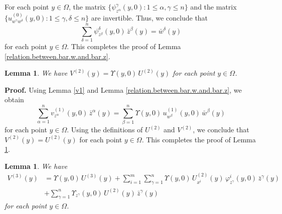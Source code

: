 \documentclass[11pt]{amsart}
\newtheorem{lemma}[theorem]{Lemma}
\theoremstyle{definition}
\begin{document}
For each point $y \in \Omega$, the matrix $\{\psi^\gamma_{z^\alpha}(y,0): 1 \leq \alpha,\gamma \leq n\}$ and the matrix $\{u^{(0)}_{w^\gamma w^\delta}(y,0): 1 \leq \gamma,\delta \leq n\}$ are invertible. Thus, we conclude that 
\[\sum_{\delta=1}^n \psi^\delta_{z^\beta}(y,0) \, \bar{z}^\beta(y) = \bar{w}^\delta(y)\] 
for each point $y \in \Omega$. This completes the proof of Lemma \ref{relation.between.bar.w.and.bar.z}. \\


\begin{lemma}
\label{relation.between.U2.and.V2}
We have $V^{(2)}(y) = \Upsilon(y,0) \, U^{(2)}(y)$ for each point $y \in \Omega$. 
\end{lemma}

\textbf{Proof.} 
Using Lemma \ref{v1} and Lemma \ref{relation.between.bar.w.and.bar.z}, we obtain 
\[\sum_{\alpha=1}^n v^{(1)}_{z^\alpha}(y,0) \, \bar{z}^\alpha(y) = \sum_{\beta=1}^n \Upsilon(y,0) \, u^{(1)}_{w^\beta}(y,0) \, \bar{w}^\beta(y)\] 
for each point $y \in \Omega$. Using the definitions of $U^{(2)}$ and $V^{(2)}$, we conclude that $V^{(2)}(y) = U^{(2)}(y)$ for each point $y \in \Omega$. This completes the proof of Lemma \ref{relation.between.U2.and.V2}. \\


\begin{lemma}
\label{relation.between.U3.and.V3}
We have 
\begin{align*} 
V^{(3)}(y) 
&= \Upsilon(y,0) \, U^{(3)}(y) + \sum_{i=1}^m \sum_{\gamma=1}^n \Upsilon(y,0) \, U^{(2)}_{x^i}(y) \, \varphi^i_{z^\gamma}(y,0) \, \bar{z}^\gamma(y) \\ 
&+ \sum_{\gamma=1}^n \Upsilon_{z^\gamma}(y,0) \, U^{(2)}(y)  \, \bar{z}^\gamma(y) 
\end{align*}
for each point $y \in \Omega$. 
\end{lemma}
\end{document}
